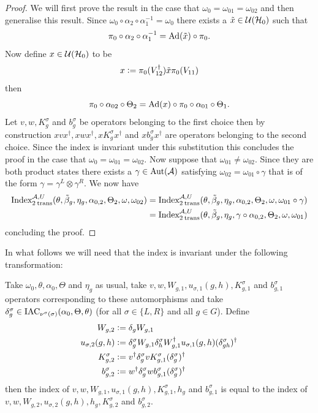 \documentclass[12pt,a4paper,twoside]{article}
\numberwithin{equation}{section}
\begin{document}
\begin{proof}
	We will first prove the result in the case that $\omega_0=\omega_{01}=\omega_{02}$ and then generalise this result. Since $\omega_0\circ\alpha_2\circ\alpha_1^{-1}=\omega_0$ there exists a $\tilde{x}\in\UU(\HH_0)$ such that
	\begin{equation}
		\pi_0\circ\alpha_2\circ\alpha_1^{-1}=\Ad{\tilde{x}}\circ\pi_0.
	\end{equation}
	Now define $x\in\UU(\HH_0)$ to be
	\begin{equation}
		x\defeq \pi_0(V_{12}^\dagger)\tilde{x} \pi_0(V_{11})
	\end{equation}
	then
	\begin{equation}
		\pi_0\circ\alpha_{02}\circ\Theta_2=\Ad{x}\circ\pi_0\circ\alpha_{01}\circ\Theta_1.
	\end{equation}
	Let $v,w,K_g^\sigma$ and $b_g^\sigma$ be operators belonging to the first choice then by construction $xvx^\dagger,xwx^\dagger,xK_g^\sigma x^\dagger$ and $xb_g^\sigma x^\dagger$ are operators belonging to the second choice. Since the index is invariant under this substitution this concludes the proof in the case that $\omega_0=\omega_{01}=\omega_{02}$. Now suppose that $\omega_{01}\neq\omega_{02}$. Since they are both product states there exists a $\gamma\in\Aut{\AA}$ satisfying $\omega_{02}=\omega_{01}\circ\gamma$ that is of the form $\gamma=\gamma^L\otimes\gamma^R$. We now have
	\begin{align}
		\textrm{Index}_{2\:\text{trans}}^{\AA,U}(\theta,\tilde{\beta}_g,\eta_g,\alpha_{0,2},\Theta_2,\omega,\omega_{02})&=\textrm{Index}_{2\:\text{trans}}^{\AA,U}(\theta,\tilde{\beta}_g,\eta_g,\alpha_{0,2},\Theta_2,\omega,\omega_{01}\circ\gamma)\\
		&=\textrm{Index}_{2\:\text{trans}}^{\AA,U}(\theta,\tilde{\beta}_g,\eta_g,\gamma\circ\alpha_{0,2},\Theta_2,\omega,\omega_{01})
	\end{align}
	concluding the proof.
\end{proof}
In what follows we will need that the index is invariant under the following transformation:
\begin{lemma}\label{lem:TransformationUnderDeltaTwoTranslations}
	Take $\omega_0,\theta,\alpha_0,\Theta$ and $\eta_g$ as usual, take $v,w,W_{g,1},u_{\sigma,1}(g,h),K_{g,1}^\sigma$ and $b_{g,1}^\sigma$ operators corresponding to these automorphisms and take $\delta^\sigma_g\in\IAC_{\nu^\sigma(\sigma)}(\alpha_0,\Theta,\theta)$ (for all $\sigma\in\{L,R\}$ and all $g\in G$). Define
	\begin{align}
		W_{g,2}&\defeq\delta_g W_{g,1}\\
		u_{\sigma,2}(g,h)&\defeq \delta_g^\sigma W_{g,1}\delta_h^\sigma W_{g,1}^\dagger u_{\sigma,1}(g,h)(\delta_{gh}^\sigma)^\dagger\\
		K^\sigma_{g,2}&\defeq v^\dagger \delta_g^\sigma v K_{g,1}^\sigma (\delta_g^\sigma)^\dagger\\
		b_{g,2}^\sigma&\defeq w^\dagger\delta^\sigma_g w b_{g,1}^\sigma (\delta^\sigma_g)^\dagger
	\end{align}
	then the index of $v,w,W_{g,1},u_{\sigma,1}(g,h),K_{g,1}^\sigma,h_g$ and $b_{g,1}^\sigma$ is equal to the index of $v,w,W_{g,2},u_{\sigma,2}(g,h),h_g,K_{g,2}^\sigma$ and $b_{g,2}^\sigma$.
\end{lemma}
\end{document}
